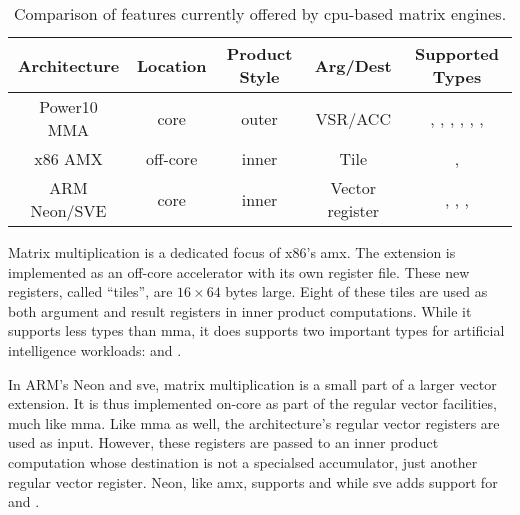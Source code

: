 \documentclass[\main/thesis.tex]{subfiles}
\begin{document}
\begin{table}
  \centering
  \begin{tabular}{| c | c | c | c | c |}
    \hline
    Architecture & Location & \parbox[t][28pt][t]{40pt}{\centering Product Style} & Arg/Dest & Supported Types\\\hline
    \parbox[t][][t]{40pt}{\centering Power10 MMA} & core & outer & VSR/ACC & \parbox[t][40pt][t]{3.2cm}{\raggedright{}, , , , , , }\\\hline
    x86 AMX & off-core & inner & Tile &\parbox[t][11pt][t]{3.3cm}{\raggedright{}, }\\\hline
    \parbox[t][][t]{60pt}{\centering ARM Neon/SVE} & core & inner & Vector register & \parbox[t][25pt][t]{3.3cm}{\raggedright{}, , , }\\\hline
  \end{tabular}
  \caption[Matrix Engine Feature Comparison]{Comparison of features currently offered by cpu-based matrix engines.}
  \label{tab:featComp}
\end{table}

Matrix multiplication is a dedicated focus of x86's \gls{amx}.
The extension is implemented as an off-core accelerator with its own register file.
These new registers, called ``tiles'', are $16 \times 64$ bytes large.
Eight of these tiles are used as both argument and result registers in inner product computations.
While it supports less types than \gls{mma}, it does supports two important types for artificial intelligence workloads:  and .

In ARM's Neon and \gls{sve}, matrix multiplication is a small part of a larger vector extension.
It is thus implemented on-core as part of the regular vector facilities, much like \gls{mma}.
Like \gls{mma} as well, the architecture's regular vector registers are used as input.
However, these registers are passed to an inner product computation whose destination is not a specialsed accumulator, just another regular vector register.
Neon, like \gls{amx}, supports  and  while \gls{sve} adds support for  and .
\end{document}
